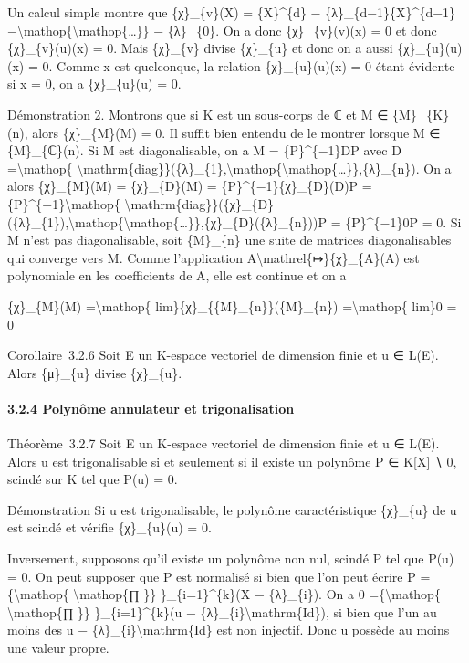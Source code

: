 \documentclass[]{article}
\begin{document}
Un calcul simple montre que \{χ\}\_\{v\}(X) = \{X\}\^{}\{d\} −
\{λ\}\_\{d−1\}\{X\}\^{}\{d−1\}
−\textbackslash{}mathop\{\textbackslash{}mathop\{\ldots{}\}\} −
\{λ\}\_\{0\}. On a donc \{χ\}\_\{v\}(v)(x) = 0 et donc
\{χ\}\_\{v\}(u)(x) = 0. Mais \{χ\}\_\{v\} divise \{χ\}\_\{u\} et donc on
a aussi \{χ\}\_\{u\}(u)(x) = 0. Comme x est quelconque, la relation
\{χ\}\_\{u\}(u)(x) = 0 étant évidente si x = 0, on a \{χ\}\_\{u\}(u) =
0.

Démonstration 2. Montrons que si K est un sous-corps de ℂ et M ∈
\{M\}\_\{K\}(n), alors \{χ\}\_\{M\}(M) = 0. Il suffit bien entendu de le
montrer lorsque M ∈ \{M\}\_\{ℂ\}(n). Si M est diagonalisable, on a M =
\{P\}\^{}\{−1\}DP avec D =\textbackslash{}mathop\{
\textbackslash{}mathrm\{diag\}\}(\{λ\}\_\{1\},\textbackslash{}mathop\{\textbackslash{}mathop\{\ldots{}\}\},\{λ\}\_\{n\}).
On a alors \{χ\}\_\{M\}(M) = \{χ\}\_\{D\}(M) =
\{P\}\^{}\{−1\}\{χ\}\_\{D\}(D)P =
\{P\}\^{}\{−1\}\textbackslash{}mathop\{
\textbackslash{}mathrm\{diag\}\}(\{χ\}\_\{D\}(\{λ\}\_\{1\}),\textbackslash{}mathop\{\textbackslash{}mathop\{\ldots{}\}\},\{χ\}\_\{D\}(\{λ\}\_\{n\}))P
= \{P\}\^{}\{−1\}0P = 0. Si M n'est pas diagonalisable, soit
\{M\}\_\{n\} une suite de matrices diagonalisables qui converge vers M.
Comme l'application A\textbackslash{}mathrel\{↦\}\{χ\}\_\{A\}(A) est
polynomiale en les coefficients de A, elle est continue et on a

\{χ\}\_\{M\}(M) =\textbackslash{}mathop\{
lim\}\{χ\}\_\{\{M\}\_\{n\}\}(\{M\}\_\{n\}) =\textbackslash{}mathop\{
lim\}0 = 0

Corollaire~3.2.6 Soit E un K-espace vectoriel de dimension finie et u ∈
L(E). Alors \{μ\}\_\{u\} divise \{χ\}\_\{u\}.

\paragraph{3.2.4 Polynôme annulateur et trigonalisation}

Théorème~3.2.7 Soit E un K-espace vectoriel de dimension finie et u ∈
L(E). Alors u est trigonalisable si et seulement si il existe un
polynôme P ∈ K{[}X{]} ∖ 0, scindé sur K tel que P(u) = 0.

Démonstration Si u est trigonalisable, le polynôme caractéristique
\{χ\}\_\{u\} de u est scindé et vérifie \{χ\}\_\{u\}(u) = 0.

Inversement, supposons qu'il existe un polynôme non nul, scindé P tel
que P(u) = 0. On peut supposer que P est normalisé si bien que l'on peut
écrire P =\{\textbackslash{}mathop\{ \textbackslash{}mathop\{∏ \}\}
\}\_\{i=1\}\^{}\{k\}(X − \{λ\}\_\{i\}). On a 0
=\{\textbackslash{}mathop\{ \textbackslash{}mathop\{∏ \}\}
\}\_\{i=1\}\^{}\{k\}(u − \{λ\}\_\{i\}\textbackslash{}mathrm\{Id\}), si
bien que l'un au moins des u − \{λ\}\_\{i\}\textbackslash{}mathrm\{Id\}
est non injectif. Donc u possède au moins une valeur propre.
\end{document}
